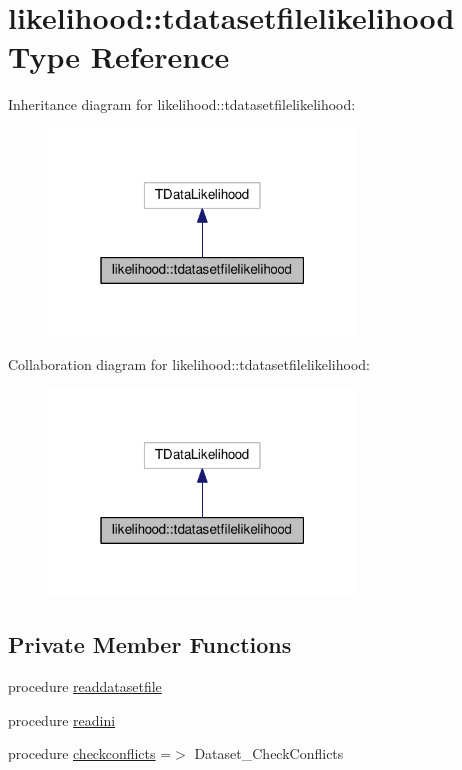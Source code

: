 \hypertarget{structlikelihood_1_1tdatasetfilelikelihood}{}\section{likelihood\+:\+:tdatasetfilelikelihood Type Reference}
\label{structlikelihood_1_1tdatasetfilelikelihood}


Inheritance diagram for likelihood\+:\+:tdatasetfilelikelihood\+:
\nopagebreak
\begin{figure}[H]
\begin{center}
\leavevmode
\includegraphics[width=232pt]{structlikelihood_1_1tdatasetfilelikelihood__inherit__graph}
\end{center}
\end{figure}


Collaboration diagram for likelihood\+:\+:tdatasetfilelikelihood\+:
\nopagebreak
\begin{figure}[H]
\begin{center}
\leavevmode
\includegraphics[width=232pt]{structlikelihood_1_1tdatasetfilelikelihood__coll__graph}
\end{center}
\end{figure}
\subsection*{Private Member Functions}
\begin{DoxyCompactItemize}
\item 
procedure \mbox{\hyperlink{structlikelihood_1_1tdatasetfilelikelihood_a1fcdd4abd25e49f8b0deebfc287160d9}{readdatasetfile}}
\item 
procedure \mbox{\hyperlink{structlikelihood_1_1tdatasetfilelikelihood_a2333447f4d2cca95f4bc6a323727e7e9}{readini}}
\item 
procedure \mbox{\hyperlink{structlikelihood_1_1tdatasetfilelikelihood_a6e34c0c228fbf1ed51e5a73958b8edad}{checkconflicts}} =$>$ Dataset\+\_\+\+Check\+Conflicts
\end{DoxyCompactItemize}
